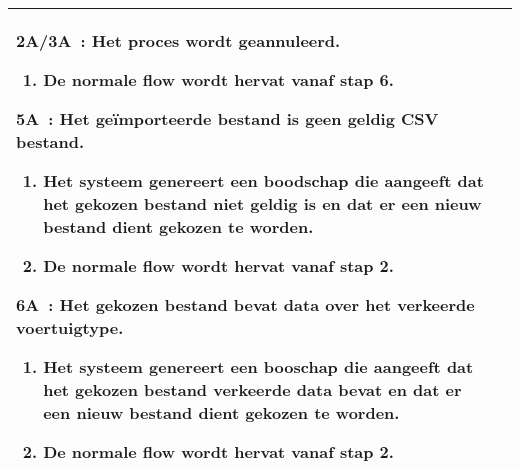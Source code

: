 \documentclass{article}
\begin{document}
\begin{tabularx}{\textwidth}{ | l | X |}
 	\textbf{2A/3A~:} Het proces wordt geannuleerd.
 	\begin{enumerate}[label=\alph*]
		\item De normale flow wordt hervat vanaf stap 6.
 	\end{enumerate}
    
  	\textbf{5A~:} Het geïmporteerde bestand is geen geldig CSV bestand.
 	\begin{enumerate}[label=\alph*]
 		\item Het systeem genereert een boodschap die aangeeft dat het gekozen bestand niet geldig is en dat er een nieuw bestand dient gekozen te worden.
		\item De normale flow wordt hervat vanaf stap 2.
 	\end{enumerate}
 
 	  	\textbf{6A~:} Het gekozen bestand bevat data over het verkeerde voertuigtype.
 	\begin{enumerate}[label=\alph*]
 	\item Het systeem genereert een booschap die aangeeft dat het gekozen bestand verkeerde data bevat en dat er een nieuw bestand dient gekozen te worden.
		\item De normale flow wordt hervat vanaf stap 2.
 	\end{enumerate}
 
 

 \\ 
 \hline

 \end{tabularx}
 
 \newpage
\end{document}
